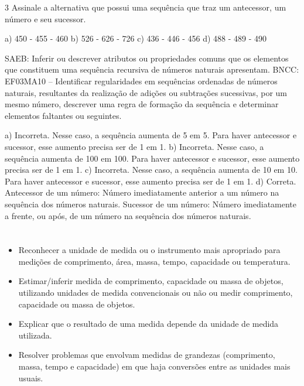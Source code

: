 \begin{escolha}
\num{3} Assinale a alternativa que possui uma sequência que traz um antecessor, um número e seu sucessor.

a) 450 - 455 - 460
b) 526 - 626 - 726
c) 436 - 446 - 456
d) 488 - 489 - 490

SAEB: Inferir ou descrever atributos ou propriedades comuns que os elementos que constituem uma sequência recursiva de números naturais apresentam.
BNCC: EF03MA10 -- Identificar regularidades em sequências ordenadas de números naturais,
resultantes da realização de adições ou subtrações sucessivas, por um mesmo número,
descrever uma regra de formação da sequência e determinar elementos faltantes ou seguintes.

a) Incorreta. Nesse caso, a sequência aumenta de 5 em 5. Para haver antecessor e sucessor, esse aumento precisa ser de 1 em 1.
b) Incorreta. Nesse caso, a sequência aumenta de 100 em 100. Para haver antecessor e sucessor, esse aumento precisa ser de 1 em 1.
c) Incorreta. Nesse caso, a sequência aumenta de 10 em 10. Para haver antecessor e sucessor, esse aumento precisa ser de 1 em 1.
d) Correta. Antecessor de um número: Número imediatamente anterior a um número na sequência dos números naturais. Sucessor de um número: Número imediatamente a frente, ou após, de um número na sequência dos números naturais.

\chapter{}



\begin{itemize}
    \item Reconhecer a unidade de medida ou o instrumento mais apropriado para
medições de comprimento, área, massa, tempo, capacidade ou temperatura.

    \item Estimar/inferir medida de comprimento, capacidade ou massa de objetos,
utilizando unidades de medida convencionais ou não ou medir comprimento,
capacidade ou massa de objetos.

    \item Explicar que o resultado de uma medida depende da unidade de medida
utilizada.

    \item Resolver problemas que envolvam medidas de grandezas (comprimento,
massa, tempo e capacidade) em que haja conversões entre as unidades mais
usuais.


\end{itemize}
\end{escolha}
